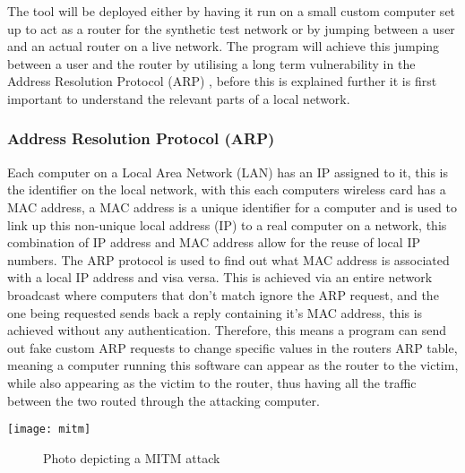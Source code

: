 
The tool will be deployed either by having it run on a small custom computer set up to act as a router for the synthetic test network or by jumping between a user and an actual router on a live network. The program will achieve this jumping between a user and the router by utilising a long term vulnerability in the Address Resolution Protocol (ARP) \citep{arp2001}, before this is explained further it is first important to understand the relevant parts of a local network.

\subsubsection{Address Resolution Protocol (ARP)}
Each computer on a Local Area Network (LAN) has an IP assigned to it, this is the identifier on the local network, with this each computers wireless card has a MAC address, a MAC address is a unique identifier for a computer and is used to link up this non-unique local address (IP) to a real computer on a network, this combination of IP address and MAC address allow for the reuse of local IP numbers. The ARP protocol is used to find out what MAC address is associated with a local IP address and visa versa. This is achieved via an entire network broadcast where computers that don't match ignore the ARP request, and the one being requested sends back a reply containing it's MAC address, this is achieved without any authentication. Therefore, this means a program can send out fake custom ARP requests to change specific values in the routers ARP table, meaning a computer running this software can appear as the router to the victim, while also appearing as the victim to the router, thus having all the traffic between the two routed through the attacking computer. 


\begin{center}
\texttt{[image: mitm]}
	\begin{figure}[h]
		\caption{Photo depicting a MITM attack}
	\end{figure}
\end{center}

